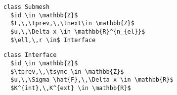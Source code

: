 
\newsavebox{\submeshlisting}
\begin{lrbox}{\submeshlisting}
\begin{lstlisting}[mathescape=true,basicstyle=\scriptsize]
class Submesh
  $id \in \mathbb{Z}$
  $t,\,\tprev,\,\tnext\in \mathbb{Z}$
  $u,\,\Delta x \in \mathbb{R}^{n_{el}}$
  $\ell,\,r \in$ Interface
\end{lstlisting}
\end{lrbox}


\newsavebox{\interfacelisting}
\begin{lrbox}{\interfacelisting}
\begin{lstlisting}[mathescape=true,basicstyle=\scriptsize]
class Interface
  $id \in \mathbb{Z}$
  $\tprev,\,\tsync \in \mathbb{Z}$
  $u,\,\Sigma \hat{F},\,\Delta x \in \mathbb{R}$
  $K^{int},\,K^{ext} \in \mathbb{R}$
\end{lstlisting}
\end{lrbox}
